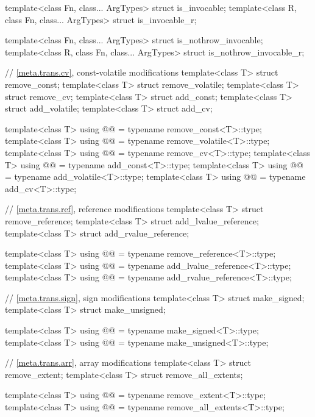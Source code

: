 \begin{codeblock}
{  template<class Fn, class... ArgTypes> struct is_invocable;
  template<class R, class Fn, class... ArgTypes> struct is_invocable_r;

  template<class Fn, class... ArgTypes> struct is_nothrow_invocable;
  template<class R, class Fn, class... ArgTypes> struct is_nothrow_invocable_r;

  // \ref{meta.trans.cv}, const-volatile modifications
  template<class T> struct remove_const;
  template<class T> struct remove_volatile;
  template<class T> struct remove_cv;
  template<class T> struct add_const;
  template<class T> struct add_volatile;
  template<class T> struct add_cv;

  template<class T>
    using @@    = typename remove_const<T>::type;
  template<class T>
    using @@ = typename remove_volatile<T>::type;
  template<class T>
    using @@       = typename remove_cv<T>::type;
  template<class T>
    using @@       = typename add_const<T>::type;
  template<class T>
    using @@    = typename add_volatile<T>::type;
  template<class T>
    using @@          = typename add_cv<T>::type;

  // \ref{meta.trans.ref}, reference modifications
  template<class T> struct remove_reference;
  template<class T> struct add_lvalue_reference;
  template<class T> struct add_rvalue_reference;

  template<class T>
    using @@     = typename remove_reference<T>::type;
  template<class T>
    using @@ = typename add_lvalue_reference<T>::type;
  template<class T>
    using @@ = typename add_rvalue_reference<T>::type;

  // \ref{meta.trans.sign}, sign modifications
  template<class T> struct make_signed;
  template<class T> struct make_unsigned;

  template<class T>
    using @@   = typename make_signed<T>::type;
  template<class T>
    using @@ = typename make_unsigned<T>::type;

  // \ref{meta.trans.arr}, array modifications
  template<class T> struct remove_extent;
  template<class T> struct remove_all_extents;

  template<class T>
    using @@      = typename remove_extent<T>::type;
  template<class T>
    using @@ = typename remove_all_extents<T>::type;

}
\end{codeblock}
